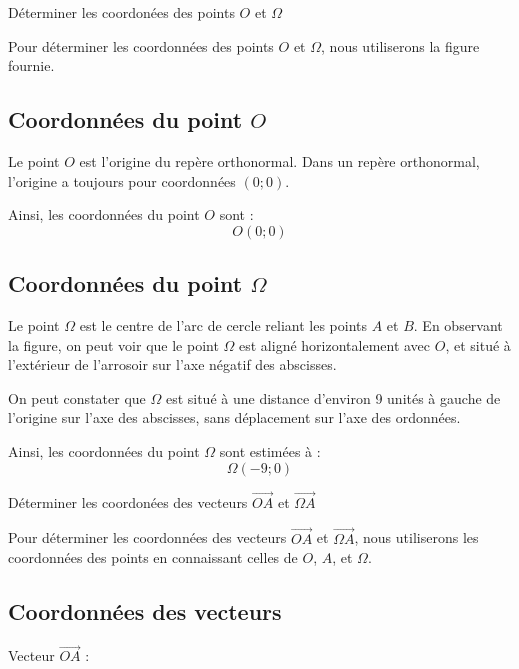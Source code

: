 \documentclass[answers]{exam}
\begin{document}
\begin{questions}
  \question[0.5] Déterminer les coordonées des points $O$ et $\Omega$ 
  

\begin{solution}
Pour déterminer les coordonnées des points $O$ et $\Omega$, nous utiliserons la figure fournie. 

\subsection*{Coordonnées du point $O$}

Le point $O$ est l'origine du repère orthonormal. Dans un repère orthonormal, l'origine a toujours pour coordonnées $(0; 0)$. 

Ainsi, les coordonnées du point $O$ sont :
\[
O(0; 0)
\]

\subsection*{Coordonnées du point $\Omega$}

Le point $\Omega$ est le centre de l'arc de cercle reliant les points $A$ et $B$. En observant la figure, on peut voir que le point $\Omega$ est aligné horizontalement avec $O$, et situé à l'extérieur de l'arrosoir sur l'axe négatif des abscisses. 

On peut constater que $\Omega$ est situé à une distance d'environ 9 unités à gauche de l'origine sur l'axe des abscisses, sans déplacement sur l'axe des ordonnées. 

Ainsi, les coordonnées du point $\Omega$ sont estimées à :
\[
\Omega(-9; 0)
\]
\end{solution}

\question[1] Déterminer les coordonées des vecteurs $\overrightarrow{OA}$ et $\overrightarrow{\Omega A}$
  

\begin{solution}
Pour déterminer les coordonnées des vecteurs $\overrightarrow{OA}$ et $\overrightarrow{\Omega A}$, nous utiliserons les coordonnées des points en connaissant celles de $O$, $A$, et $\Omega$.

\subsection*{Coordonnées des vecteurs}



\item 
Vecteur $\overrightarrow{OA}$ :


\end{solution}
\end{questions}
\end{document}
